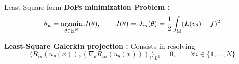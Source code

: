 \begin{frame}{Least-Square form}
%
	\textbf{DoFs minimization Problem :}
	\begin{equation*}
		\displaystyle \theta_u=\operatorname*{argmin}_{\theta\in\mathbb{R}^N} J(\theta), \qquad J(\theta)=J_{in}(\theta)=\frac{1}{2}\int_\Omega (L(v_\theta) - f)^2 \label{minpb_leastsquare_discret}
	\end{equation*}
	
	\textbf{Least-Square Galerkin projection :} Consists in resolving
	\begin{equation*}
		\langle R_{in}(u_\theta(x)),(\nabla_\theta R_{in}(u_\theta(x)))_i\rangle_{L^2}=0, \qquad \forall i\in\{1,\dots,N\}\label{leastsquare_proj}
	\end{equation*}
	

\end{frame}
